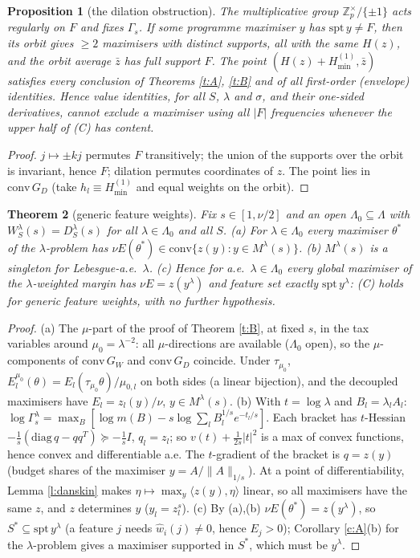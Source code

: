 \documentclass[11pt]{article}
\newtheorem{theorem}{Theorem}\newtheorem{lemma}[theorem]{Lemma}\newtheorem{proposition}[theorem]{Proposition}
\theoremstyle{remark}\newtheorem{remark}[theorem]{Remark}
\begin{document}
\begin{proposition}[the dilation obstruction]\label{p:orbit}
The multiplicative group $\mathbb Z_p^\times/\{\pm1\}$ acts regularly on $F$ and fixes $\Gamma_s$. If some programme maximiser
$y$ has $\mathrm{spt}\,y\ne F$, then its orbit gives $\ge2$ maximisers with distinct supports, all with the same $H(z)$, and the
orbit average $\bar z$ has full support $F$. The point $(H(z)+H^{(1)}_{\min},\bar z)$ satisfies every conclusion of Theorems
\ref{t:A}, \ref{t:B} and of all first-order (envelope) identities. Hence value identities, for all $S$, $\lambda$ and $\sigma$, and
their one-sided derivatives, cannot exclude a maximiser using all $|F|$ frequencies whenever the upper half of (C) has content.
\end{proposition}
\begin{proof}
$j\mapsto\pm kj$ permutes $F$ transitively; the union of the supports over the orbit is invariant, hence $F$; dilation permutes
coordinates of $z$. The point lies in $\mathrm{conv}\,G_D$ (take $h_l\equiv H^{(1)}_{\min}$ and equal weights on the orbit).
\end{proof}

\begin{theorem}[generic feature weights]\label{t:G}
Fix $s\in[1,\nu/2]$ and an open $\Lambda_0\subseteq\Lambda$ with $W^\lambda_S(s)=D^\lambda_S(s)$ for all $\lambda\in\Lambda_0$ and all $S$.
(a) For $\lambda\in\Lambda_0$ every maximiser $\theta^*$ of the $\lambda$-problem has $\nu E(\theta^*)\in\mathrm{conv}\{z(y):y\in M^\lambda(s)\}$.
(b) $M^\lambda(s)$ is a singleton for Lebesgue-a.e.\ $\lambda$.
(c) Hence for a.e.\ $\lambda\in\Lambda_0$ every global maximiser of the $\lambda$-weighted margin has $\nu E=z(y^\lambda)$ and
feature set exactly $\mathrm{spt}\,y^\lambda$: (C) holds for generic feature weights, with no further hypothesis.
\end{theorem}
\begin{proof}
(a) The $\mu$-part of the proof of Theorem \ref{t:B}, at fixed $s$, in the tax variables around $\mu_0=\lambda^{-2}$: all
$\mu$-directions are available ($\Lambda_0$ open), so the $\mu$-components of $\mathrm{conv}\,G_W$ and $\mathrm{conv}\,G_D$ coincide.
Under $\tau_{\mu_0}$, $E^{\mu_0}_l(\theta)=E_l(\tau_{\mu_0}\theta)/\mu_{0,l}$ on both sides (a linear bijection), and the
decoupled maximisers have $E_l=z_l(y)/\nu$, $y\in M^\lambda(s)$.
(b) With $t=\log\lambda$ and $B_l=\lambda_lA_l$: $\log\Gamma^\lambda_s=\max_{B}[\log m(B)-s\log\sum_lB_l^{1/s}e^{-t_l/s}]$.
Each bracket has $t$-Hessian $-\frac1s(\mathrm{diag}\,q-qq^T)\succeq-\frac1sI$, $q_l=z_l$; so $v(t)+\frac1{2s}|t|^2$ is a max of convex
functions, hence convex and differentiable a.e. The $t$-gradient of the bracket is $q=z(y)$ (budget shares of the
maximiser $y=A/\|A\|_{1/s}$). At a point of differentiability, Lemma \ref{l:danskin} makes $\eta\mapsto\max_{y}\langle z(y),\eta\rangle$
linear, so all maximisers have the same $z$, and $z$ determines $y$ ($y_l=z_l^s$).
(c) By (a),(b) $\nu E(\theta^*)=z(y^\lambda)$, so $S^*\subseteq\mathrm{spt}\,y^\lambda$ (a feature $j$ needs $\hat w_i(j)\ne0$, hence $E_j>0$);
Corollary \ref{c:A}(b) for the $\lambda$-problem gives a maximiser supported in $S^*$, which must be $y^\lambda$.
\end{proof}
\end{document}
